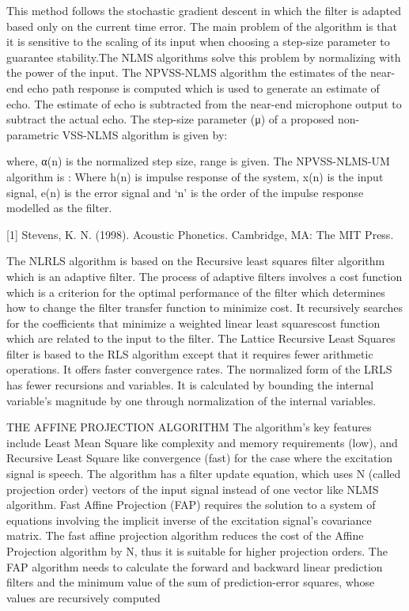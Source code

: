 \documentclass[10pt,twocolumn]{witseiepaper}
\begin{document}
This method follows the stochastic gradient descent in which the filter is adapted based only on the current time error. The main problem of the algorithm is that it is sensitive to the scaling of its input when choosing a step-size parameter to guarantee stability.The NLMS algorithms solve this problem by normalizing with the power of the input. 
The NPVSS-NLMS algorithm the estimates of the near-end echo path response is computed which is used to generate an estimate of echo. The estimate of echo is subtracted from the near-end microphone output to subtract the actual echo. The step-size parameter (μ) of a proposed non-parametric VSS-NLMS algorithm is given by:

where, α(n) is the normalized step size, range is given.
The NPVSS-NLMS-UM algorithm is : 
Where h(n) is impulse response of the system, x(n) is the input signal, e(n) is the error signal and ‘n’ is the order of the impulse response modelled as the filter.


[1] Stevens, K. N. (1998). Acoustic Phonetics. Cambridge, MA: The MIT Press.

The NLRLS algorithm is based on the Recursive least squares filter algorithm which is an adaptive filter. The process of adaptive filters involves a cost function which is a criterion for the optimal performance of the filter which determines how to change the filter transfer function to minimize cost. It recursively searches for the coefficients that minimize a weighted linear least squarescost function which are related to the input to the filter.
The Lattice Recursive Least Squares filter is based to the RLS algorithm except that it requires fewer arithmetic operations. It offers faster convergence rates. The normalized form of the LRLS has fewer recursions and variables. It is calculated by bounding the internal variable’s magnitude by one through normalization of the internal variables.

THE AFFINE PROJECTION ALGORITHM
The algorithm’s key features include Least Mean Square like complexity and memory requirements (low), and Recursive Least Square like convergence (fast) for the case where the excitation signal is speech. The algorithm has a filter update equation, which uses N (called projection order) vectors of the input signal instead of one vector like NLMS algorithm. 
Fast Affine Projection (FAP) requires the solution to a system of equations involving the implicit inverse of the excitation signal’s covariance matrix. The fast affine projection algorithm reduces the cost of the Affine Projection algorithm by N, thus it is suitable for higher projection orders. The FAP algorithm needs to calculate the forward and backward linear prediction filters and the minimum value of the sum of prediction-error squares, whose values are recursively computed
\end{document}
